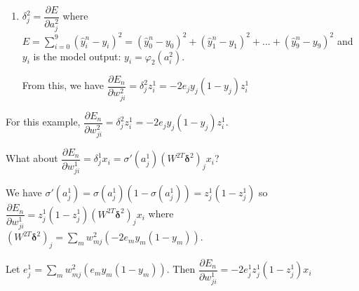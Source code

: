 \documentclass[12pt,letterpaper,noanswers]{exam}
\newcommand{\vc}[1]{\boldsymbol{#1}}
\newcommand{\note}[1]{{#1}} %
\begin{document}
\begin{enumerate}[resume=classQ]
\item $\delta_j^2 = \dfrac{\partial E}{\partial a_j^2}$ where $E = \sum\limits_{i=0}^9 (\hat{y}_i^n-y_i)^2 = (\hat{y}_0^n - y_0)^2 + (\hat{y}_1^n - y_1)^2 + ... + (\hat{y}_9^n - y_9)^2$ and $y_i$ is the model output: $y_i = \varphi_2(a_i^2)$.

From this, we have $\dfrac{\partial E_n}{\partial w_{ji}^2} = \delta_j^2 z_i^{1} = -2e_{j}y_j(1-y_j)z_i^1$

\end{enumerate}
\note{\begin{tcolorbox}
For this example, $\dfrac{\partial E_n}{\partial w_{ji}^2} = \delta_j^2 z_i^{1} = -2e_{j}y_j(1-y_j)z_i^1$.

What about
$\dfrac{\partial E_n}{\partial w_{ji}^1} = \delta_j^1 x_i = \sigma'(a_j^1)(W^{2T}\vc{\delta}^2)_j x_i$? 

We have $\sigma'(a_j^1) = \sigma(a_j^1)(1-\sigma(a_j^1)) = z_j^1(1-z_j^1)$ so 
$\dfrac{\partial E_n}{\partial w_{ji}^1} =  z_j^1(1-z_j^1)(W^{2T}\vc{\delta}^2)_j x_i$ where $(W^{2T}\vc{\delta}^2)_j = \sum\limits_m w_{mj}^2(-2e_my_m(1-y_m))$.

Let $e_j^1 = \sum\limits_m w_{mj}^2(e_my_m(1-y_m))$.  Then $\dfrac{\partial E_n}{\partial w_{ji}^1} =  -2e^1_jz_j^1(1-z_j^1)x_i$
\end{tcolorbox}}
\end{document}
